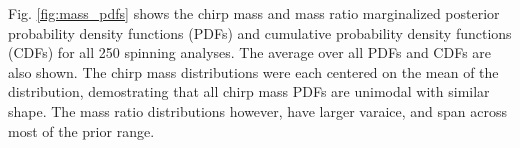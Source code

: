 Fig. \ref{fig:mass_pdfs} shows the chirp mass and mass ratio marginalized posterior probability density functions (PDFs) and cumulative probability density functions (CDFs) for all 250 spinning analyses.  The average over all PDFs and CDFs are also shown.  The chirp mass distributions were each centered on the mean of the distribution, demostrating that all chirp mass PDFs are unimodal with similar shape.  The mass ratio distributions however, have larger varaice, and span across most of the prior range.